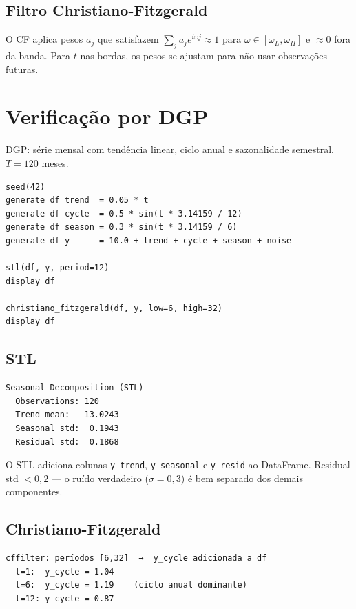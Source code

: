 \subsection*{Filtro Christiano-Fitzgerald}

O CF aplica pesos $a_j$ que satisfazem $\sum_j a_j e^{i\omega j} \approx 1$
para $\omega \in [\omega_L, \omega_H]$ e $\approx 0$ fora da banda.
Para $t$ nas bordas, os pesos se ajustam para não usar observações futuras.

\section{Verificação por DGP}

DGP: série mensal com tendência linear, ciclo anual e sazonalidade semestral.
$T = 120$ meses.

\begin{lstlisting}[caption={STL e Christiano-Fitzgerald}]
seed(42)
generate df trend  = 0.05 * t
generate df cycle  = 0.5 * sin(t * 3.14159 / 12)
generate df season = 0.3 * sin(t * 3.14159 / 6)
generate df y      = 10.0 + trend + cycle + season + noise

stl(df, y, period=12)
display df

christiano_fitzgerald(df, y, low=6, high=32)
display df
\end{lstlisting}

\subsection*{STL}

\begin{lstlisting}[language={}, basicstyle=\ttfamily\small, frame=none,
  numbers=none, backgroundcolor=\color{codbg}]
Seasonal Decomposition (STL)
  Observations: 120
  Trend mean:   13.0243
  Seasonal std:  0.1943
  Residual std:  0.1868
\end{lstlisting}

O STL adiciona colunas \texttt{y\_trend}, \texttt{y\_seasonal} e \texttt{y\_resid}
ao DataFrame. Residual std $< 0{,}2$ — o ruído verdadeiro ($\sigma = 0{,}3$) é
bem separado dos demais componentes.

\subsection*{Christiano-Fitzgerald}

\begin{lstlisting}[language={}, basicstyle=\ttfamily\small, frame=none,
  numbers=none, backgroundcolor=\color{codbg}]
cffilter: períodos [6,32]  →  y_cycle adicionada a df
  t=1:  y_cycle = 1.04
  t=6:  y_cycle = 1.19    (ciclo anual dominante)
  t=12: y_cycle = 0.87
\end{lstlisting}


